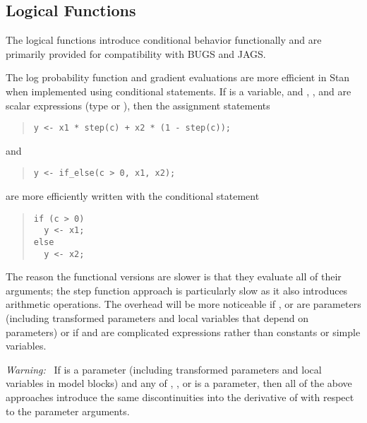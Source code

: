 \subsection{Logical Functions}

The logical functions introduce conditional behavior functionally and
are primarily provided for compatibility with BUGS and JAGS.
%
\begin{description}
%
%
%
\end{description}

The log probability function and gradient evaluations are more
efficient in Stan when implemented using conditional statements.  If
 is a  variable, and , , and
 are scalar expressions (type  or ),
then the assignment statements
%
\begin{quote}
\begin{Verbatim}
y <- x1 * step(c) + x2 * (1 - step(c));
\end{Verbatim}
\end{quote}
%
and
%
\begin{quote}
\begin{Verbatim}
y <- if_else(c > 0, x1, x2);
\end{Verbatim}
\end{quote}
%
are more efficiently written with the conditional statement
%
\begin{quote}
\begin{Verbatim}
if (c > 0)
  y <- x1;
else
  y <- x2;
\end{Verbatim}
\end{quote}
%
The reason the functional versions are slower is that they evaluate
all of their arguments; the step function approach is particularly
slow as it also introduces arithmetic operations.  The overhead will
be more noticeable if ,  or 
are parameters (including transformed parameters and local variables
that depend on parameters) or if  and  are
complicated expressions rather than constants or simple variables.  

\emph{Warning: } \ If  is a parameter (including transformed
parameters and local variables in model blocks) and any of ,
, or  is a parameter, then all of the above
approaches introduce the same discontinuities into the derivative of
 with respect to the parameter arguments.


